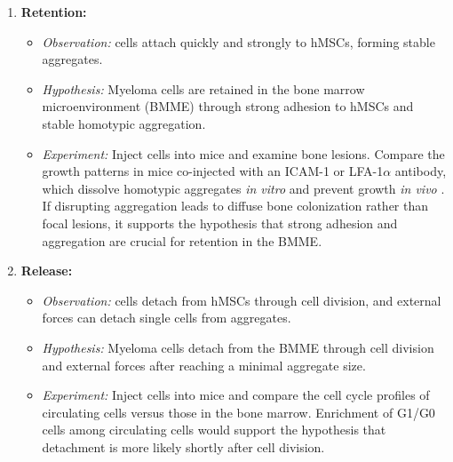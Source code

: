 \begin{enumerate}
      \item \textbf{Retention:}
            \begin{itemize}
                  \item \textit{Observation:} \INA cells attach quickly and
                        strongly to \acp{hMSC}, forming stable aggregates.
                  \item \textit{Hypothesis:} Myeloma cells are retained in the
                        bone marrow microenvironment (BMME) through strong adhesion to
                        \acp{hMSC} and stable homotypic aggregation.
                  \item \textit{Experiment:} Inject \INA cells into mice and
                        examine bone lesions. Compare the growth patterns in mice
                        co-injected with an ICAM-1 or LFA-1$\alpha$ antibody, which
                        dissolve homotypic aggregates \textit{in vitro} and prevent
                        \INA growth \textit{in vivo}
                        \cite{kawanoHomotypicCellAggregations1991a,
                              klauszNovelFcengineeredHuman2017}. If disrupting aggregation
                        leads to diffuse bone colonization rather than focal lesions,
                        it supports the hypothesis that strong adhesion and
                        aggregation are crucial for retention in the \ac{BMME}.
            \end{itemize}
      \item \textbf{Release:}
            \begin{itemize}
                  \item \textit{Observation:} \INA cells detach from \acp{hMSC}
                        through cell division, and external forces can detach single
                        cells from \INA aggregates.
                  \item \textit{Hypothesis:} Myeloma cells detach from the BMME
                        through cell division and external forces after reaching a
                        minimal aggregate size.
                  \item \textit{Experiment:} Inject \INA cells into mice and
                        compare the cell cycle profiles of circulating cells versus
                        those in the bone marrow. Enrichment of G1/G0 cells among
                        circulating cells would support the hypothesis that detachment
                        is more likely shortly after cell division.

\end{itemize}
\end{enumerate}
